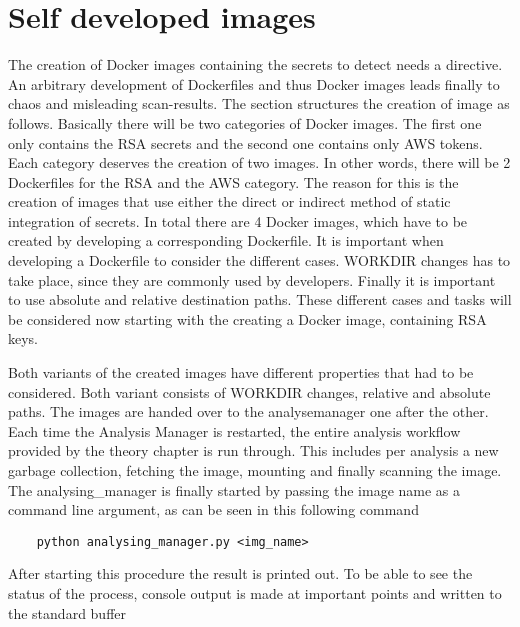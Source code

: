 \section{Self developed images}
\label{ch:eval:local_images}
The creation of Docker images containing the secrets to detect needs a directive. An arbitrary development of Dockerfiles and thus Docker images leads finally to chaos and misleading scan-results. 
The section structures the creation of image as follows. Basically there will be two categories of Docker images. The first one only contains the RSA secrets and the second one contains only AWS tokens.
Each category deserves the creation of two images. In other words, there will be 2 Dockerfiles for the RSA and the AWS category. The reason for this is the creation of images that use either the direct or indirect method of static integration of secrets. In total there are 4 Docker images, which have to be created by developing a corresponding Dockerfile. It is important when developing a Dockerfile to consider the different cases. WORKDIR changes has to take place, since they are commonly used by developers. Finally it is important to use absolute and relative destination paths. These different cases and tasks will be considered now starting with the creating a Docker image, containing RSA keys.



Both variants of the created images have different properties that had to be considered. Both variant consists of WORKDIR changes, relative and absolute paths. The images are handed over to the analysemanager one after the other. Each time the Analysis Manager is restarted, the entire analysis workflow provided by the theory chapter is run through. This includes per analysis a new garbage collection, fetching the image, mounting and finally scanning the image.
The analysing_manager is finally started by passing the image name as a command line argument, as can be seen in this following command
\begin{lstlisting}
	python analysing_manager.py <img_name>
\end{lstlisting}
After starting this procedure the result is printed out. To be able to see the status of the process, console output is made at important points and written to the standard buffer

